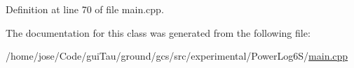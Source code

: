 Definition at line 70 of file main.\-cpp.



The documentation for this class was generated from the following file\-:\begin{DoxyCompactItemize}
\item 
/home/jose/\-Code/gui\-Tau/ground/gcs/src/experimental/\-Power\-Log6\-S/\hyperlink{gcs_2src_2experimental_2_power_log6_s_2main_8cpp}{main.\-cpp}\end{DoxyCompactItemize}
